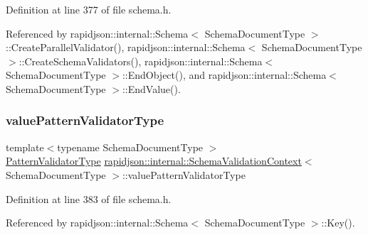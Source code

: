 Definition at line 377 of file schema.\+h.



Referenced by rapidjson\+::internal\+::\+Schema$<$ Schema\+Document\+Type $>$\+::\+Create\+Parallel\+Validator(), rapidjson\+::internal\+::\+Schema$<$ Schema\+Document\+Type $>$\+::\+Create\+Schema\+Validators(), rapidjson\+::internal\+::\+Schema$<$ Schema\+Document\+Type $>$\+::\+End\+Object(), and rapidjson\+::internal\+::\+Schema$<$ Schema\+Document\+Type $>$\+::\+End\+Value().

\mbox{\label{structrapidjson_1_1internal_1_1_schema_validation_context_a00dbd559e72f4bb12fc201c49ffa35c4}} 
\subsubsection{\texorpdfstring{valuePatternValidatorType}{valuePatternValidatorType}}
{\footnotesize\ttfamily template$<$typename Schema\+Document\+Type $>$ \\
\mbox{\hyperlink{structrapidjson_1_1internal_1_1_schema_validation_context_ad47d3576f164e17986132a570f721a46}{Pattern\+Validator\+Type}} \mbox{\hyperlink{structrapidjson_1_1internal_1_1_schema_validation_context}{rapidjson\+::internal\+::\+Schema\+Validation\+Context}}$<$ Schema\+Document\+Type $>$\+::value\+Pattern\+Validator\+Type}



Definition at line 383 of file schema.\+h.



Referenced by rapidjson\+::internal\+::\+Schema$<$ Schema\+Document\+Type $>$\+::\+Key().

\mbox{\label{structrapidjson_1_1internal_1_1_schema_validation_context_af00ced23554e0b9c84e8750c97143f60}} 

